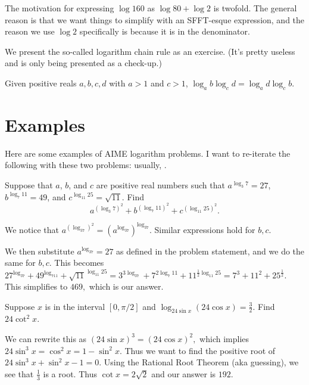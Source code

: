 The motivation for expressing $\log 160$ as $\log 80 + \log 2$ is twofold. The general reason is that we want things to simplify with an SFFT-esque expression, and the reason we use $\log 2$ specifically is because it is in the denominator.

We present the so-called logarithm chain rule as an exercise. (It's pretty useless and is only being presented as a check-up.)

\begin{exer}
Given positive reals $a,b,c,d$ with $a>1$ and $c>1$, $\log_{a}b\log_{c}d=\log_{a}d\log_{c}b.$
\end{exer}

\section{Examples}
Here are some examples of AIME logarithm problems. I want to re-iterate the following with these two problems: usually, .

\begin{exam}[AIME II 2009/2]
Suppose that $a$, $b$, and $c$ are positive real numbers such that $a^{\log_3 7} = 27$, $b^{\log_7 11} = 49$, and $c^{\log_{11}25} = \sqrt{11}$. Find
\[a^{(\log_3 7)^2} + b^{(\log_7 11)^2} + c^{(\log_{11} 25)^2}.\]
\end{exam}

\begin{sol} We notice that $a^{(\log_37)^2}=(a^{\log_37})^{\log_37}.$ Similar expressions hold for $b,c.$

We then substitute $a^{\log_37}=27$ as defined in the problem statement, and we do the same for $b,c$. This becomes $27^{\log_37}+49^{\log_711}+\sqrt{11}^{\log_{11}25}=3^{3\log_37}+7^{2\log_7{11}}+11^{\frac{1}{2}\log_{11}25}=7^3+11^2+25^{\frac{1}{2}}.$ This simplifies to $469,$ which is our answer.\end{sol}

\begin{exam}[AIME I 2011/9]
Suppose $x$ is in the interval $[0, \pi/2]$ and $\log_{24\sin x} (24\cos x)=\frac{3}{2}$. Find $24\cot^2 x$.
\end{exam}

\begin{sol}
We can rewrite this as $(24\sin x)^3=(24\cos x)^2,$ which implies $24\sin^3 x=\cos^2 x=1-\sin^2 x.$ Thus we want to find the positive root of $24\sin^3 x+\sin^2 x-1=0.$ Using the Rational Root Theorem (aka guessing), we see that $\frac{1}{3}$ is a root. Thus $\cot x=2\sqrt{2}$ and our answer is $192.$\end{sol}
